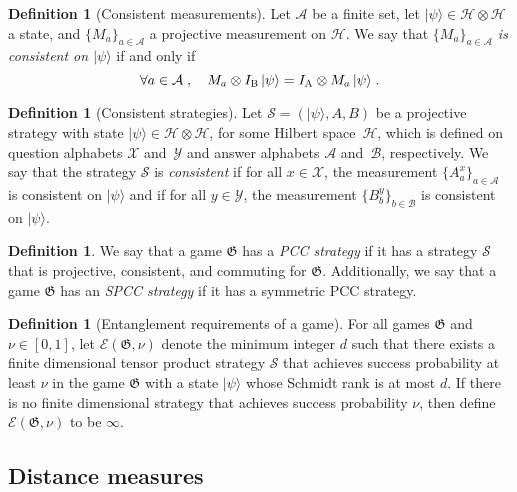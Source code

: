 \documentclass[11pt]{article}
\theoremstyle{definition}
\newtheorem{definition}[theorem]{Definition}
\newcommand{\ket}[1]{|#1\rangle}
\newcommand{\Id}{\ensuremath{I}}
\newcommand{\mA}{\ensuremath{\mathcal{A}}}
\newcommand{\mH}{\ensuremath{\mathcal{H}}}
\newcommand{\game}{\mathfrak{G}}
\newcommand{\strategy}{\mathscr{S}}
\newcommand{\labelstyle}[1]{\ensuremath{\textsc{#1}}\xspace}
\newcommand{\alice}{\labelstyle{A}}
\newcommand{\bob}{\labelstyle{B}}
\newcommand{\Ent}{\mathscr{E}}
\renewcommand{\cal}[1]{\mathcal{#1}}
\begin{document}
\begin{definition}[Consistent measurements]
  \label{def:consistent-measurement}
  Let $\cal{A}$ be a finite set, let $\ket{\psi} \in \mH \otimes \mH$ a
  state, and $\{ M_a \}_{a \in \cal{A}}$ a projective measurement on
  $\mH$.
  We say that \emph{$\{M_a\}_{a \in \cal{A}}$ is consistent on $\ket{\psi}$} if
  and only if
  \begin{equation*}
    \forall a \in \mA\;,\quad M_a \otimes \Id_\bob\, \ket{\psi}
    = \Id_\alice \otimes M_a\, \ket{\psi}\;.
  \end{equation*}
\end{definition}

\begin{definition}[Consistent strategies]
  \label{def:consistent-strategy}
	Let $\strategy = (\ket{\psi}, A, B)$ be a  projective strategy with state $\ket{\psi} \in \mH \otimes \mH$,
	for some Hilbert space~$\mH$, which is defined
  on question alphabets $\cal{X}$ and~$\cal{Y}$ and answer alphabets $\cal{A}$ and~$\cal{B}$, respectively.
  We say that the strategy $\strategy$ is \emph{consistent} if for all $x \in
  \cal{X}$, the measurement $\{A^x_a\}_{a \in \cal{A}}$ is consistent on
  $\ket{\psi}$
  and if for all $y \in
  \cal{Y}$, the measurement $\{B^y_b\}_{b \in \cal{B}}$ is consistent on
  $\ket{\psi}$.
\end{definition}

\begin{definition}
  \label{def:spcc}
  We say that a game $\game$ has a \emph{PCC strategy} if it has a strategy
  $\strategy$ that is projective, consistent, and commuting for $\game$.
  Additionally, we say that a game $\game$ has an \emph{SPCC strategy} if it has
  a symmetric PCC strategy.
\end{definition}

\begin{definition}[Entanglement requirements of a game]
  \label{def:ent}
	For all games $\game$ and $\nu \in [0, 1]$, let $\Ent(\game, \nu)$ denote the
  minimum integer $d$ such that there exists a finite dimensional tensor product
  strategy $\strategy$ that achieves success probability at least $\nu$ in the
  game $\game$ with a state $\ket{\psi}$ whose Schmidt rank is at most $d$.
  If there is no finite dimensional strategy that achieves success probability
  $\nu$, then define $\Ent(\game, \nu)$ to be $\infty$.
\end{definition}

\subsection{Distance measures}
\end{document}
